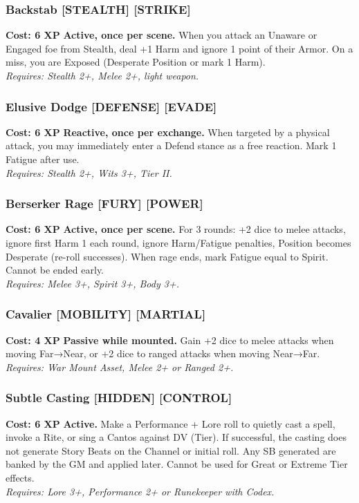 \subsubsection*{Backstab \textnormal{[STEALTH] [STRIKE]}}
\label{talent:backstab}
\textbf{Cost: 6 XP} \textbf{Active, once per scene.} When you attack an Unaware or Engaged foe from Stealth, deal +1 Harm and ignore 1 point of their Armor. On a miss, you are Exposed (Desperate Position or mark 1 Harm). \\
\textit{Requires: Stealth 2+, Melee 2+, light weapon.}

\subsubsection*{Elusive Dodge \textnormal{[DEFENSE] [EVADE]}}
\label{talent:elusive-dodge}
\textbf{Cost: 6 XP} \textbf{Reactive, once per exchange.} When targeted by a physical attack, you may immediately enter a Defend stance as a free reaction. Mark 1 Fatigue after use. \\
\textit{Requires: Stealth 2+, Wits 3+, Tier II.}

\subsubsection*{Berserker Rage \textnormal{[FURY] [POWER]}}
\label{talent:berserker-rage}
\textbf{Cost: 6 XP} \textbf{Active, once per scene.} For 3 rounds: +2 dice to melee attacks, ignore first Harm 1 each round, ignore Harm/Fatigue penalties, Position becomes Desperate (re-roll successes). When rage ends, mark Fatigue equal to Spirit. Cannot be ended early. \\
\textit{Requires: Melee 3+, Spirit 3+, Body 3+.}

\subsubsection*{Cavalier \textnormal{[MOBILITY] [MARTIAL]}}
\label{talent:cavalier}
\textbf{Cost: 4 XP} \textbf{Passive while mounted.} Gain +2 dice to melee attacks when moving Far→Near, or +2 dice to ranged attacks when moving Near→Far. \\
\textit{Requires: War Mount Asset, Melee 2+ or Ranged 2+.}

\subsubsection*{Subtle Casting \textnormal{[HIDDEN] [CONTROL]}}
\label{talent:subtle-casting}
\textbf{Cost: 6 XP} \textbf{Active.} Make a Performance + Lore roll to quietly cast a spell, invoke a Rite, or sing a Cantos against DV (Tier). If successful, the casting does not generate Story Beats on the Channel or initial roll. Any SB generated are banked by the GM and applied later. Cannot be used for Great or Extreme Tier effects. \\
\textit{Requires: Lore 3+, Performance 2+ or Runekeeper with Codex.}

